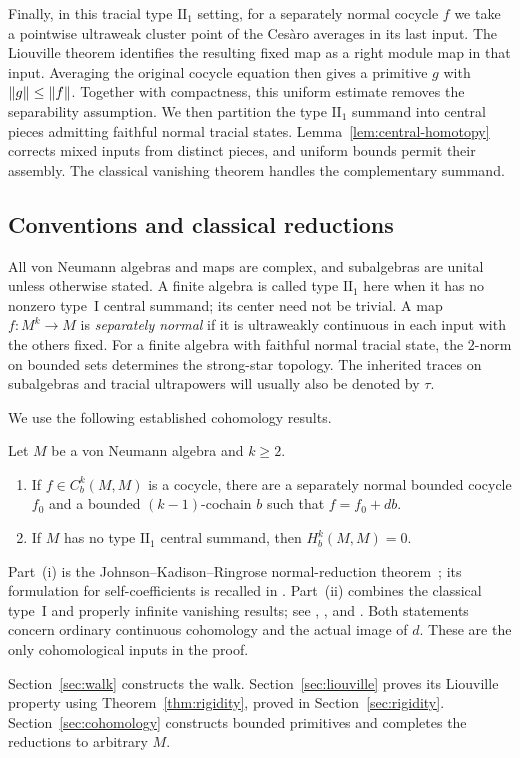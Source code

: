 Finally, in this tracial type \(\mathrm{II}_1\) setting, for a
separately normal cocycle \(f\) we take a pointwise ultraweak cluster
point of the Ces\`aro averages in its last input.
The Liouville theorem identifies the resulting fixed map as a
right module map in that input. Averaging the original cocycle equation
then gives a primitive \(g\) with
\(\lVert g\rVert\leq\lVert f\rVert\).
Together with compactness, this uniform estimate removes the
separability assumption. We then partition the type
\(\mathrm{II}_1\) summand into central pieces admitting faithful
normal tracial states. Lemma~\ref{lem:central-homotopy} corrects
mixed inputs from distinct pieces, and uniform bounds permit their
assembly. The classical vanishing theorem handles the complementary
summand.

\subsection{Conventions and classical reductions}

All von Neumann algebras and maps are complex, and subalgebras are
unital unless otherwise stated. A finite algebra is called
type \(\mathrm{II}_1\) here when it has no nonzero type~I central
summand; its center need not be trivial.
A map \(f:M^k\to M\) is \emph{separately normal} if it is
ultraweakly continuous in each input with the others fixed.
For a finite algebra with faithful normal tracial state, the
\(2\)-norm on bounded sets determines the strong-star topology.
The inherited traces on subalgebras and tracial ultrapowers will
usually also be denoted by \(\tau\).

We use the following established cohomology results.
\begin{samepage}
\begin{proposition}\label{prop:classical}
Let \(M\) be a von Neumann algebra and \(k\geq2\).
\begin{enumerate}[label=\textup{(\roman*)}]
\item If \(f\in C_b^k(M,M)\) is a cocycle, there are a separately
normal bounded cocycle \(f_0\) and a bounded \((k-1)\)-cochain \(b\)
such that \(f=f_0+db\).
\item If \(M\) has no type \(\mathrm{II}_1\) central summand, then
\(H_b^k(M,M)=0\).
\end{enumerate}
\end{proposition}
\end{samepage}

Part~\textup{(i)} is the Johnson--Kadison--Ringrose normal-reduction
theorem~\cite[Lemma~5.4 and Theorem~5.6]{JKR1972}; its formulation for self-coefficients is recalled
in \cite[Section~2]{CPSS2003}.
Part~\textup{(ii)} combines the classical type~I and properly infinite
vanishing results; see \cite[Theorem~4.4]{KadisonRingrose1971},
\cite{CES1987}, and \cite[p.~636, equation~(1.1)]{CPSS2003}.
Both statements concern ordinary continuous cohomology and the actual
image of \(d\). These are the only cohomological inputs in the proof.

Section~\ref{sec:walk} constructs the walk.
Section~\ref{sec:liouville} proves its Liouville property using
Theorem~\ref{thm:rigidity}, proved in Section~\ref{sec:rigidity}.
Section~\ref{sec:cohomology} constructs bounded primitives and
completes the reductions to arbitrary \(M\).
